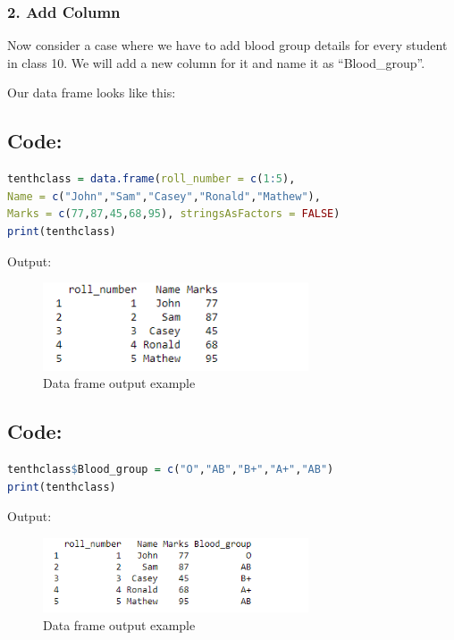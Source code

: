 \documentclass[10pt]{book}
\begin{document}
\subsubsection*{2. Add Column}
Now consider a case where we have to add blood group details for every student in class 10. We will add a new column for it and name it as “Blood\_group”.

Our data frame looks like this:

\subsection*{Code:}
\begin{lstlisting}[language=R]
tenthclass = data.frame(roll_number = c(1:5),
Name = c("John","Sam","Casey","Ronald","Mathew"),
Marks = c(77,87,45,68,95), stringsAsFactors = FALSE)
print(tenthclass)
\end{lstlisting}

\noindent Output:
\begin{figure}[H]
    \begin{flushleft}
        \includegraphics[width=0.7\textwidth]{Data-Frames-in-R-1-9.png}
        \caption{Data frame output example}
        \label{fig:dataframe}
    \end{flushleft}
\end{figure}

\subsection*{Code:}
\begin{lstlisting}[language=R]
tenthclass$Blood_group = c("O","AB","B+","A+","AB")
print(tenthclass)
\end{lstlisting}

\noindent Output:
\begin{figure}[H]
    \begin{flushleft}
        \includegraphics[width=0.7\textwidth]{Data-Frames-in-R-1-10.png}
        \caption{Data frame output example}
        \label{fig:dataframe}
    \end{flushleft}
\end{figure}
\end{document}

